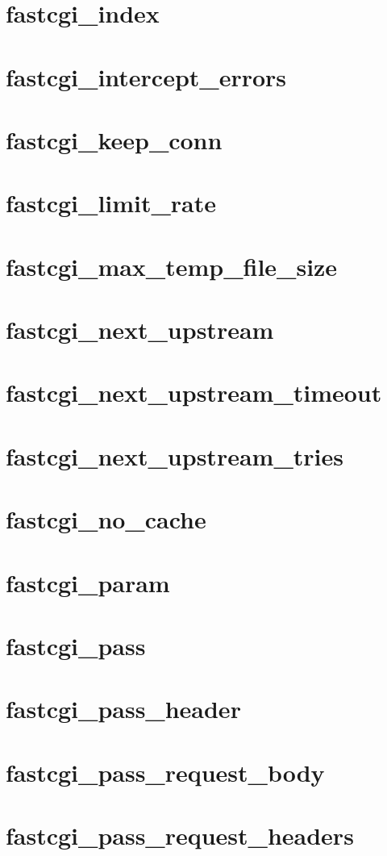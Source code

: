 \section{fastcgi\_index}
\section{fastcgi\_intercept\_errors}
\section{fastcgi\_keep\_conn}
\section{fastcgi\_limit\_rate}
\section{fastcgi\_max\_temp\_file\_size}
\section{fastcgi\_next\_upstream}
\section{fastcgi\_next\_upstream\_timeout}
\section{fastcgi\_next\_upstream\_tries}
\section{fastcgi\_no\_cache}
\section{fastcgi\_param}
\section{fastcgi\_pass}
\section{fastcgi\_pass\_header}
\section{fastcgi\_pass\_request\_body}
\section{fastcgi\_pass\_request\_headers}
